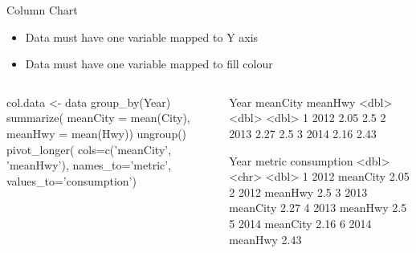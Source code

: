 \documentclass[ignorenonframetext,xcolor=x11names]{beamer}
\begin{document}
\begin{frame}[fragile]{Column Chart}
\begin{itemize}
   \item Data must have one variable mapped to Y axis
   \item Data must have one variable mapped to fill colour
\end{itemize}

\begin{columns}
\begin{column}{.6\textwidth}
\begin{Rcode}
col.data <- data %
   group_by(Year) %
   summarize(
     meanCity = mean(City), 
     meanHwy = mean(Hwy)) %
   ungroup() %
   pivot_longer(
     cols=c('meanCity', 'meanHwy'), 
     names_to='metric', 
     values_to='consumption')
\end{Rcode}
\end{column}
\begin{column}{.5\textwidth}
\begin{textcode}
   Year meanCity meanHwy
  <dbl>    <dbl>   <dbl>
1  2012     2.05    2.5 
2  2013     2.27    2.5 
3  2014     2.16    2.43
\end{textcode}
\begin{textcode}
   Year metric   consumption
  <dbl> <chr>          <dbl>
1  2012 meanCity        2.05
2  2012 meanHwy         2.5 
3  2013 meanCity        2.27
4  2013 meanHwy         2.5 
5  2014 meanCity        2.16
6  2014 meanHwy         2.43
\end{textcode}
\end{column}
\end{columns}
\end{frame}
\end{document}
